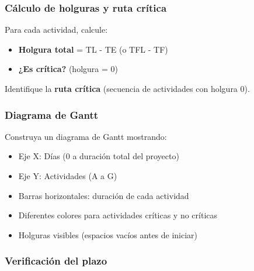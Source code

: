 \documentclass[12pt,a4paper]{article}
\begin{document}
%	
%	
	\subsubsection{Cálculo de holguras y ruta crítica}
	
	Para cada actividad, calcule:
	
	\begin{itemize}
		\item \textbf{Holgura total} = TL - TE (o TFL - TF)
		\item \textbf{¿Es crítica?} (holgura = 0)
	\end{itemize}
	
	Identifique la \textbf{ruta crítica} (secuencia de actividades con holgura 0).
	
	\subsubsection{Diagrama de Gantt}
	
	Construya un diagrama de Gantt mostrando:
	
	\begin{itemize}
		\item Eje X: Días (0 a duración total del proyecto)
		\item Eje Y: Actividades (A a G)
		\item Barras horizontales: duración de cada actividad
		\item Diferentes colores para actividades críticas y no críticas
		\item Holguras visibles (espacios vacíos antes de iniciar)
	\end{itemize}
	
	\subsubsection{Verificación del plazo}
	
\end{document}
